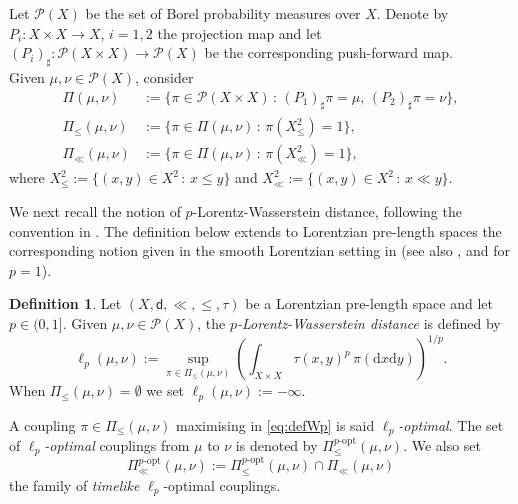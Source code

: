 \documentclass[a4paper,10pt]{article}
\newcommand{\supp}{\text{\rm supp}}
\newcommand{\di}{\mathrm{d}}
\newcommand{\sfd}{\mathsf d}
\theoremstyle{plain}
\theoremstyle{definition}
\newtheorem{definition}[lemma]{Definition}
\numberwithin{equation}{section}
\begin{document}
Let $\mathcal{P}(X)$ be the set of Borel probability measures over $X$.  Denote by $P_i:X\times X\to X$, $i=1,2$ the projection map and let $(P_i)_{\sharp}: \mathcal{P}(X\times X)\to \mathcal{P}(X)$ be the corresponding push-forward map.
\\Given $\mu,\nu\in \mathcal{P}(X)$, consider
%
\begin{align*}
 \Pi(\mu,\nu)&:=\{\pi\in  \mathcal{P}(X\times X) \,:\, (P_{1})_{\sharp}\pi=\mu, \, (P_{2})_{\sharp}\pi=\nu \}, \nonumber \\
 \Pi_{\leq}(\mu,\nu)&:=\{\pi\in  \Pi(\mu,\nu) \,:\,  \pi(X^{2}_{\leq})=1 \}, 
\nonumber \\
  \Pi_{\ll}(\mu,\nu)&:=\{\pi\in  \Pi(\mu,\nu) \,:\,  \pi(X^{2}_{\ll})=1 \}, 
\end{align*}
%
where $X^{2}_{\leq}:=\{(x,y) \in X^{2}\,:\, x\leq y \}$ and   $X^{2}_{\ll}:=\{(x,y) \in X^{2}\,:\, x\ll y \}$.  



We next recall the notion of $p$-Lorentz-Wasserstein distance, following the convention in \cite{CaMo:20}. The definition below extends to Lorentzian pre-length spaces the corresponding notion given in the smooth Lorentzian setting in \cite{EM17}  (see also \cite{McCann, MoSu}, and \cite{Suhr} for $p=1$). 

\begin{definition}\label{def:Wp}
Let  $(X,\sfd, \ll, \leq, \tau)$ be a Lorentzian pre-length space and let $p\in (0,1]$. Given $\mu,\nu\in \mathcal{P}(X)$, the \emph{$p$-Lorentz-Wasserstein distance} is defined by
\begin{equation}\label{eq:defWp}
\ell_{p}(\mu,\nu):= \sup_{\pi \in \Pi_{\leq}(\mu,\nu)} \left(  \int_{X\times X}  \tau(x,y)^{p} \, \pi(\di x \di y)\right)^{1/p}.
\end{equation}
When $\Pi_{\leq}(\mu,\nu)=\emptyset$ we set $\ell_{p}(\mu,\nu):=-\infty$.
\end{definition}


A coupling  $\pi\in  \Pi_{\leq}(\mu,\nu)$ maximising in \eqref{eq:defWp} is said \emph{$\ell_{p}$-optimal}. The set of \emph{$\ell_{p}$-optimal} couplings from $\mu$ to $\nu$ is denoted by $  \Pi_{\leq}^{p\text{-opt}}(\mu,\nu)$. We also set 
$$
\Pi_{\ll}^{p\text{-opt}}(\mu,\nu):= \Pi_{\leq}^{p\text{-opt}}(\mu,\nu)\cap \Pi_{\ll}(\mu,\nu)
$$
the  family of \emph{timelike}  $\ell_{p}$-optimal couplings.
\end{document}
